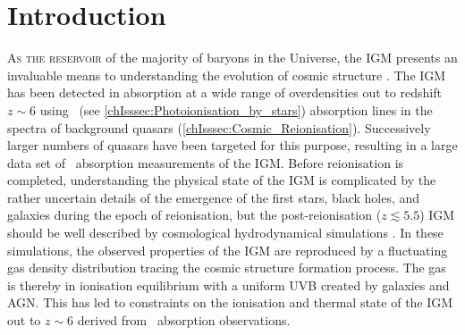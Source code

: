 \newpage

\section{Introduction}
\label{chPsec:Introduction}

\lettrine{A}{s the reservoir} of the majority of baryons in the Universe, the IGM presents an invaluable means to understanding the evolution of cosmic structure \citep{2009RvMP...81.1405M}. The IGM has been detected in absorption at a wide range of overdensities out to redshift $z \sim 6$ using  \lya\ (see \cref{chIsssec:Photoionisation_by_stars}) absorption lines in the spectra of background quasars (\cref{chIsssec:Cosmic_Reionisation}). Successively larger numbers of quasars have been targeted for this purpose, resulting in a large data set of \lya\ absorption measurements of the IGM. Before reionisation is completed, understanding the physical state of the IGM is complicated by the rather uncertain details of the emergence of the first stars, black holes, and galaxies during the epoch of reionisation, but the post-reionisation ($z \lesssim 5.5$) IGM should be well described by cosmological hydrodynamical simulations \citep{1994ApJ...437L...9C, 1996ApJ...457L..51H, 1999elss.conf..346W, 2017ApJ...837..106O, 2019MNRAS.486.4075O, 2015MNRAS.446.3697L, 2017MNRAS.464..897B}. In these simulations, the observed properties of the IGM are reproduced by a fluctuating gas density distribution tracing the cosmic structure formation process. The gas is thereby in ionisation equilibrium with a uniform UVB created by galaxies and AGN. This has led to constraints on the ionisation and thermal state of the IGM out to $z \sim 6$ \citep{1997ApJ...489....7R, 1999ApJ...511..521D, 2000MNRAS.318..817S, 2003MNRAS.342.1205M, 2008ApJ...688...85F, 2011MNRAS.410.1096B, 2012MNRAS.419.2880B, 2013MNRAS.436.1023B, 2017PhLB..773..258G, 2019ApJ...872...13W, 2019MNRAS.486..769K} derived from \lya\ absorption observations.


